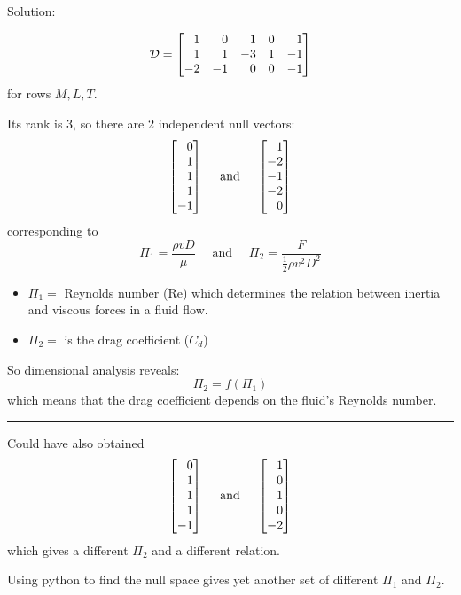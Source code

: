 \documentclass{workbook}
\begin{document}
\begin{solution}
\begin{slide}

Solution:

\[ \mathcal{D} = 
	\mat{1 & 0 & 1  & 0 & 1 \\
		1 & 1 & -3 & 1 & -1 \\
		-2 & -1 & 0 & 0 & -1}
\]
for rows $M,L,T$.

Its rank is 3, so there are 2 independent null vectors:
\[ \mat{0\\1\\1\\1\\-1} \quad \text{ and } \quad \mat{1\\-2\\-1\\-2\\0}
\]
corresponding to
\[
\Pi_1 = \frac{\rho v D}{\mu}
\quad \text{ and } \quad 
\Pi_2 = \frac{F}{\frac12\rho v^2 D^2}
\]

\begin{itemize}
	\item $\Pi_1 = $ Reynolds number (Re) which determines the relation between inertia and viscous forces in a fluid flow.
	\item $\Pi_2 = $ is the drag coefficient ($C_d$)
\end{itemize}

So dimensional analysis reveals:
\[ \Pi_2 = f(\Pi_1) \]
which means that the drag coefficient depends on the fluid's Reynolds number. \\

\hrule

Could have also obtained
\[ \mat{0\\1\\1\\1\\-1} \quad \text{ and } \quad \mat{1\\0\\1\\0\\-2} \]
which gives a different $\Pi_2$ and a different relation.
\end{slide}


\begin{slide}

	Using python to find the null space gives yet another set of different $\Pi_1$ and $\Pi_2$.


\end{slide}
\end{solution}
\end{document}
